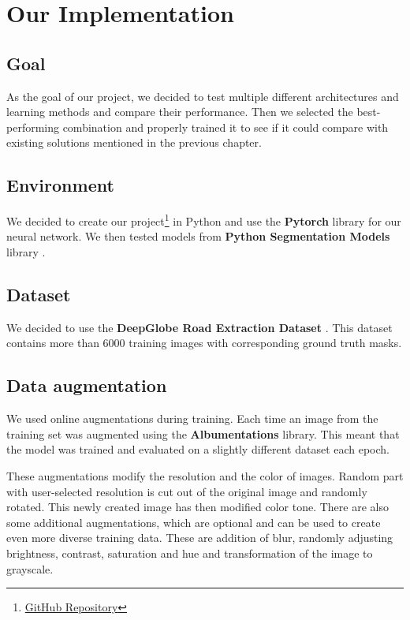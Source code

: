 \documentclass[12pt]{article}
\begin{document}
\section{Our Implementation}

\subsection{Goal}
As the goal of our project, we decided to test multiple different architectures and learning methods and compare their performance. Then we selected the best-performing combination and properly trained it to see if it could compare with existing solutions mentioned in the previous chapter.

\subsection{Environment}
We decided to create our project\footnote{\href{https://github.com/JuliusJx/POVa-Road-Segmentation}{GitHub Repository}} in Python and use the \textbf{Pytorch} library for our neural network. We then tested models from \textbf{Python Segmentation Models} library \cite{segmodels}. 

\subsection{Dataset}
We decided to use the \textbf{DeepGlobe Road Extraction Dataset} \cite{dataset}. This dataset contains more than 6000 training images with corresponding ground truth masks.

\subsection{Data augmentation}
We used online augmentations during training. Each time an image from the training set was augmented using the \textbf{Albumentations} library. This meant that the model was trained and evaluated on a slightly different dataset each epoch.

These augmentations modify the resolution and the color of images. Random part with user-selected resolution is cut out of the original image and randomly rotated. This newly created image has then modified color tone. There are also some additional augmentations, which are optional and can be used to create even more diverse training data. These are addition of blur, randomly adjusting brightness, contrast, saturation and hue and transformation of the image to grayscale.  
\end{document}
